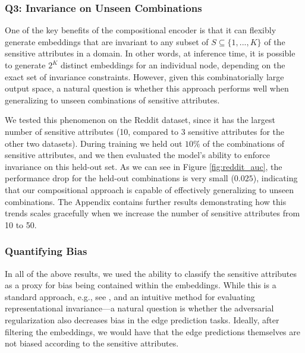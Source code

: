 \subsubsection*{Q3: Invariance on Unseen Combinations}\label{subsubsec:comp_generalizability}

One of the key benefits of the compositional encoder is that it can flexibly generate embeddings that are invariant to any subset of $S \subseteq \{1, ..., K\}$ of the sensitive attributes in a domain. 
In other words, at inference time, it is possible to generate $2^K$ distinct embeddings for an individual node, depending on the exact set of invariance constraints. 
However, given this combinatorially large output space, a natural question is whether this approach performs well when generalizing to unseen combinations of sensitive attributes.

We tested this phenomenon on the Reddit dataset, since it has the largest number of sensitive attributes (10, compared to 3 sensitive attributes for the other two datasets). 
During training we held out $10\%$ of the combinations of sensitive attributes, and we then evaluated the model's ability to enforce invariance on this held-out set.
As we can see in Figure \ref{fig:reddit_auc}, the performance drop for the held-out combinations is very small ($0.025$), indicating that our compositional approach is capable of effectively generalizing to unseen combinations. 
The Appendix contains further results demonstrating how this trends scales gracefully when we increase the number of sensitive attributes from 10 to 50. 

\subsubsection*{Quantifying Bias}
In all of the above results, we used the ability to classify the sensitive attributes as a proxy for bias being contained within the embeddings.
While this is a standard approach, e.g., see \citet{edwards2015censoring}, and an intuitive method for evaluating representational invariance---a natural question is whether the adversarial regularization also decreases bias in the edge prediction tasks. 
Ideally, after filtering the embeddings, we would have that the edge predictions themselves are not biased according to the sensitive attributes.


